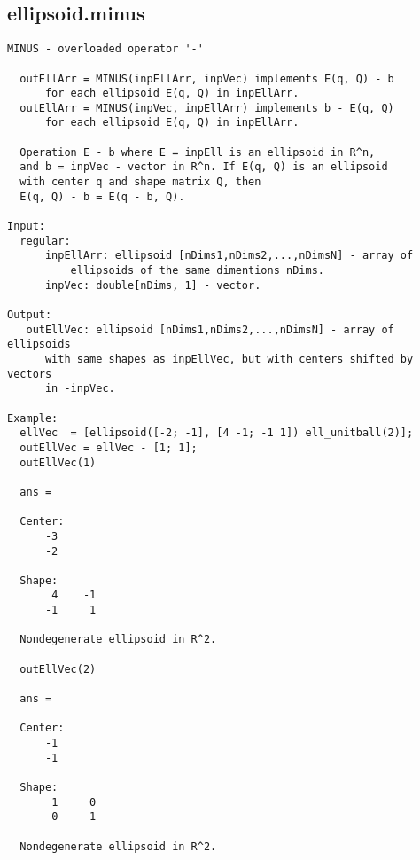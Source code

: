 \subsection{\texorpdfstring{ellipsoid.minus}{minus}}\label{method:ellipsoid.minus}
\begin{verbatim}
MINUS - overloaded operator '-'

  outEllArr = MINUS(inpEllArr, inpVec) implements E(q, Q) - b
      for each ellipsoid E(q, Q) in inpEllArr.
  outEllArr = MINUS(inpVec, inpEllArr) implements b - E(q, Q)
      for each ellipsoid E(q, Q) in inpEllArr.

  Operation E - b where E = inpEll is an ellipsoid in R^n,
  and b = inpVec - vector in R^n. If E(q, Q) is an ellipsoid
  with center q and shape matrix Q, then
  E(q, Q) - b = E(q - b, Q).

Input:
  regular:
      inpEllArr: ellipsoid [nDims1,nDims2,...,nDimsN] - array of
          ellipsoids of the same dimentions nDims.
      inpVec: double[nDims, 1] - vector.

Output:
   outEllVec: ellipsoid [nDims1,nDims2,...,nDimsN] - array of ellipsoids
      with same shapes as inpEllVec, but with centers shifted by vectors
      in -inpVec.

Example:
  ellVec  = [ellipsoid([-2; -1], [4 -1; -1 1]) ell_unitball(2)];
  outEllVec = ellVec - [1; 1];
  outEllVec(1)

  ans =

  Center:
      -3
      -2

  Shape:
       4    -1
      -1     1

  Nondegenerate ellipsoid in R^2.

  outEllVec(2)

  ans =

  Center:
      -1
      -1

  Shape:
       1     0
       0     1

  Nondegenerate ellipsoid in R^2.
\end{verbatim}
